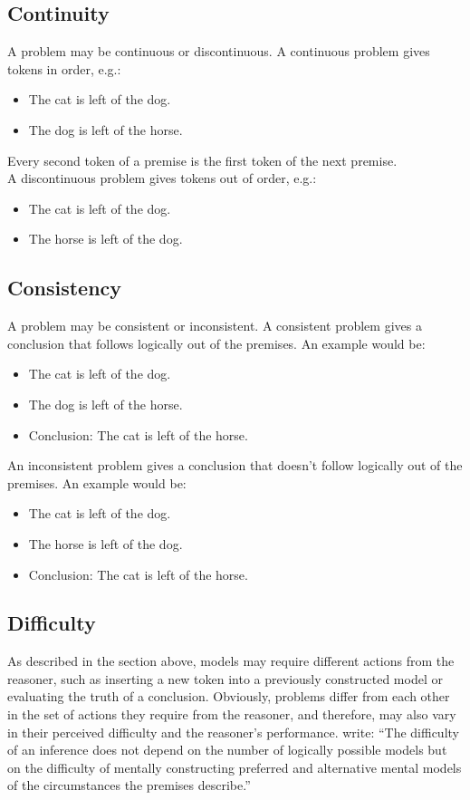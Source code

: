 \documentclass[hidelinks]{scrartcl}
\begin{document}
\subsection{Continuity}
A problem may be continuous or discontinuous. A continuous problem gives tokens in order, e.g.:
\begin{itemize}
\item The cat is left of the dog.
\item The dog is left of the horse.
\end{itemize}

\noindent Every second token of a premise is the first token of the next premise. \\

\noindent A discontinuous problem gives tokens out of order, e.g.:
\begin{itemize}
\item The cat is left of the dog.
\item The horse is left of the dog.
\end{itemize}

\subsection{Consistency}
A problem may be consistent or inconsistent. A consistent problem gives a conclusion that follows logically out of the premises. An example would be:
\begin{itemize}
\item The cat is left of the dog.
\item The dog is left of the horse.
\item Conclusion: The cat is left of the horse.
\end{itemize}

An inconsistent problem gives a conclusion that doesn't follow logically out of the premises. An example would be:
\begin{itemize}
\item The cat is left of the dog.
\item The horse is left of the dog.
\item Conclusion: The cat is left of the horse.
\end{itemize}

\subsection{Difficulty}
As described in the section above, models may require different actions from the reasoner, such as inserting a new token into a previously constructed model or evaluating the truth of a conclusion. Obviously, problems differ from each other in the set of actions they require from the reasoner, and therefore, may also vary in their perceived difficulty and the reasoner's performance. \cite{Ragni.2013} write: ``The difficulty of an inference does not depend on the number of logically possible models but on the difficulty of mentally constructing preferred and alternative mental
models of the circumstances the premises describe.''
\end{document}
